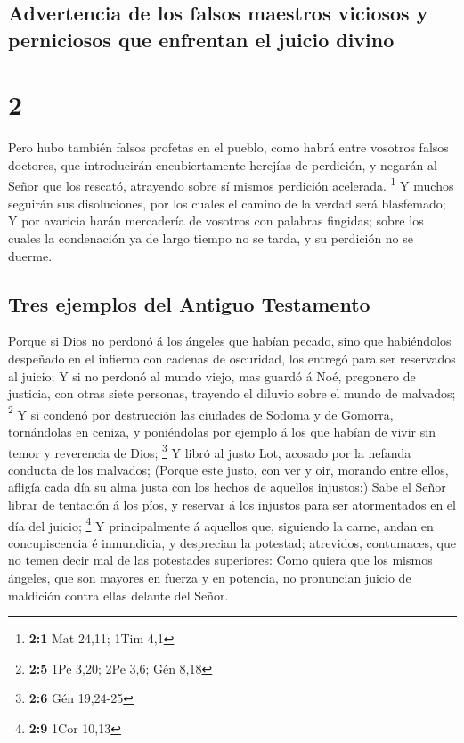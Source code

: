 \hypertarget{advertencia-de-los-falsos-maestros-viciosos-y-perniciosos-que-enfrentan-el-juicio-divino}{%
\subsection{Advertencia de los falsos maestros viciosos y perniciosos
que enfrentan el juicio
divino}\label{advertencia-de-los-falsos-maestros-viciosos-y-perniciosos-que-enfrentan-el-juicio-divino}}

\hypertarget{section-1}{%
\section{2}\label{section-1}}

 Pero hubo también falsos profetas en el pueblo, como habrá
entre vosotros falsos doctores, que introducirán encubiertamente
herejías de perdición, y negarán al Señor que los rescató, atrayendo
sobre sí mismos perdición acelerada. \footnote{\textbf{2:1} Mat 24,11;
  1Tim 4,1}  Y muchos seguirán sus disoluciones, por los
cuales el camino de la verdad será blasfemado;  Y por
avaricia harán mercadería de vosotros con palabras fingidas; sobre los
cuales la condenación ya de largo tiempo no se tarda, y su perdición no
se duerme.

\hypertarget{tres-ejemplos-del-antiguo-testamento}{%
\subsection{Tres ejemplos del Antiguo
Testamento}\label{tres-ejemplos-del-antiguo-testamento}}

 Porque si Dios no perdonó á los ángeles que habían pecado,
sino que habiéndolos despeñado en el infierno con cadenas de oscuridad,
los entregó para ser reservados al juicio;  Y si no perdonó
al mundo viejo, mas guardó á Noé, pregonero de justicia, con otras siete
personas, trayendo el diluvio sobre el mundo de malvados; \footnote{\textbf{2:5}
  1Pe 3,20; 2Pe 3,6; Gén 8,18}  Y si condenó por destrucción
las ciudades de Sodoma y de Gomorra, tornándolas en ceniza, y
poniéndolas por ejemplo á los que habían de vivir sin temor y reverencia
de Dios; \footnote{\textbf{2:6} Gén 19,24-25}  Y libró al
justo Lot, acosado por la nefanda conducta de los malvados; 
(Porque este justo, con ver y oir, morando entre ellos, afligía cada día
su alma justa con los hechos de aquellos injustos;)  Sabe el
Señor librar de tentación á los píos, y reservar á los injustos para ser
atormentados en el día del juicio; \footnote{\textbf{2:9} 1Cor 10,13}
 Y principalmente á aquellos que, siguiendo la carne, andan
en concupiscencia é inmundicia, y desprecian la potestad; atrevidos,
contumaces, que no temen decir mal de las potestades superiores:
 Como quiera que los mismos ángeles, que son mayores en
fuerza y en potencia, no pronuncian juicio de maldición contra ellas
delante del Señor.

